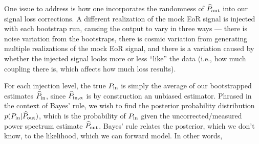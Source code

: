 \documentclass[preprint2,numberedappendix,tighten]{aastex6}  %
\newcommand{\phat}{\widehat{\mathbf{p}}}
\newcommand{\acl}[1]{{\color{red} \textbf{[ACL:  #1]}}}
\newcommand{\dcj}[1]{{\color{orange} \textbf{[DCJ: #1]}}}
\begin{document}

One issue to address is how one incorporates the randomness of $\widehat{P}_{\rm out}$ into our signal loss corrections. A different realization of the mock EoR signal is injected with each bootstrap run, causing the output to vary in three ways ---  there is noise variation from the bootstraps, there is cosmic variation from generating multiple realizations of the mock EoR signal, and there is a variation caused by whether the injected signal looks more or less ``like'' the data (i.e., how much coupling there is, which affects how much loss results). 

For each injection level, the true $P_{\rm in}$ is simply the average of our bootstrapped estimates $\widehat{P}_{\rm in}$, since $\widehat{P}_{\rm in, \alpha}$ is by construction an unbiased estimator. Phrased in the context of Bayes' rule, we wish to find the posterior probability distribution $p(P_{\rm in} | 
\widehat{P}_{\rm out})$, which is the probability of $P_{\rm in}$ given the uncorrected/measured power spectrum estimate $\widehat{P}_{\rm out}$.  Bayes' rule relates the posterior, which we don't know, to the likelihood, which we can forward model. In other words,
\end{document}
